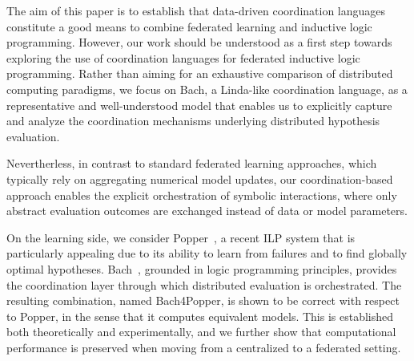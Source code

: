 The aim of this paper is to establish that data-driven coordination languages constitute a good means to combine federated learning and inductive logic programming. However, our work should be understood as a first step towards exploring the use of coordination languages for federated inductive logic programming. Rather than aiming for an exhaustive comparison of distributed computing paradigms, we focus on Bach, a Linda-like coordination language, as a representative and well-understood model that enables us to explicitly capture and analyze the coordination mechanisms underlying distributed hypothesis evaluation.

Nevertherless, in contrast to standard federated learning approaches, which typically rely on aggregating numerical model updates, our coordination-based approach enables the explicit orchestration of symbolic interactions, where only abstract evaluation outcomes are exchanged instead of data or model parameters.

On the learning side, we consider Popper~\cite{cropper2021learning}, a recent ILP system that is particularly appealing due to its ability to learn from failures and to find globally optimal hypotheses. Bach~\cite{DJL18}, grounded in logic programming principles, provides the coordination layer through which distributed evaluation is orchestrated. The resulting combination, named Bach4Popper, is shown to be correct with respect to Popper, in the sense that it computes equivalent models. This is established both theoretically and experimentally, and we further show that computational performance is preserved when moving from a centralized to a federated setting.



